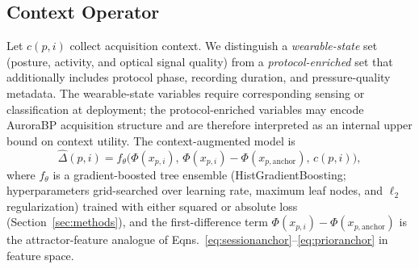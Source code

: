 \documentclass[journal]{IEEEtran}
\begin{document}
\subsection{Context Operator}
\label{sec:context}
Let $c(p,i)$ collect acquisition context. We distinguish a \emph{wearable-state} set (posture, activity, and optical signal quality) from a \emph{protocol-enriched} set that additionally includes protocol phase, recording duration, and pressure-quality metadata. The wearable-state variables require corresponding sensing or classification at deployment; the protocol-enriched variables may encode AuroraBP acquisition structure and are therefore interpreted as an internal upper bound on context utility. The context-augmented model is
\begin{equation}
\hat{\Delta}(p,i) = f_\theta\big(\Phi(x_{p,i}),\, \Phi(x_{p,i}) - \Phi(x_{p,\mathrm{anchor}}),\, c(p,i)\big),
\label{eq:model}
\end{equation}
where $f_\theta$ is a gradient-boosted tree ensemble (HistGradientBoosting; hyperparameters grid-searched over learning rate, maximum leaf nodes, and $\ell_2$ regularization) trained with either squared or absolute loss (Section~\ref{sec:methods}), and the first-difference term $\Phi(x_{p,i}) - \Phi(x_{p,\mathrm{anchor}})$ is the attractor-feature analogue of Eqns.~\ref{eq:sessionanchor}--\ref{eq:prioranchor} in feature space.
\end{document}
